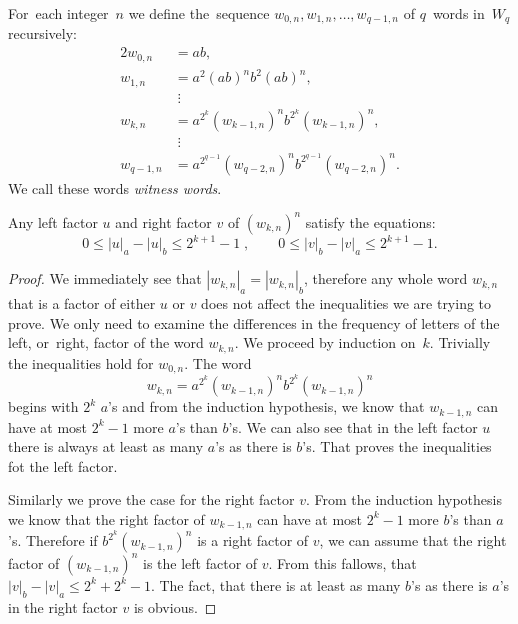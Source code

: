 \begin{defn}
    For~each integer~$n$ we define the~sequence $w_{0,n}, w_{1,n}, \dotsc , w_{q-1,n}$ of $q$~words in~$W_q$ recursively:
    \begin{alignat*}{2}
        w_{0,n} &= ab,\\
        w_{1,n} &= a^2{(ab)}^{n}b^2{(ab)}^{n},\\
                &\; \vdots \\
        w_{k,n} &= a^{2^k}{(w_{k-1,n})}^{n}b^{2^k}{(w_{k-1,n})}^{n},\\
                &\; \vdots \\
        w_{q-1,n} &= a^{2^{q-1}}{(w_{q-2,n})}^{n}b^{2^{q-1}}{(w_{q-2,n})}^{n}.
    \end{alignat*}
    We call these words \emph{witness words}.
\end{defn}

\begin{lemma}\label{lm:witness_words_inequalities}
    Any left factor $u$ and right factor $v$ of ${(w_{k,n})}^n$ satisfy the equations:
    \[
        0 \leq |u|_a - |u|_b \leq 2^{k+1}-1 \; , \qquad 0 \leq |v|_b - |v|_a \leq 2^{k+1}-1.
    \]
\end{lemma}

\begin{proof}
    We immediately see that $|w_{k,n}|_a = |w_{k,n}|_b$, therefore any whole word $w_{k,n}$ that is a factor of either $u$ or $v$ does not affect the inequalities we are trying to prove. We only need to examine the differences in the frequency of letters of the left, or~right, factor of the word $w_{k,n}$. We proceed by induction on~$k$. Trivially the inequalities hold for $w_{0,n}$. The word
    \[
        w_{k,n} = a^{2^k}{(w_{k-1,n})}^{n}b^{2^k}{(w_{k-1,n})}^{n}
    \] begins with $2^k$ $a$'s and from the induction hypothesis, we know that $w_{k-1,n}$ can have at most $2^k-1$ more $a$'s than $b$'s. We can also see that in the left factor $u$ there is always at least as many $a$'s as there is $b$'s. That proves the inequalities fot the left factor.

    Similarly we prove the case for the right factor $v$. From the induction hypothesis we know that the right factor of $w_{k-1,n}$ can have at most $2^k-1$ more $b$'s than $a$'s. Therefore if $b^{2^k}{(w_{k-1,n})}^{n}$ is a right factor of $v$, we can assume that the right factor of ${(w_{k-1,n})}^{n}$ is the left factor of $v$. From this fallows, that $|v|_b - |v|_a \leq 2^k + 2^k -1$. The fact, that there is at least as many $b$'s as there is $a$'s in the right factor $v$ is obvious.
\end{proof}

